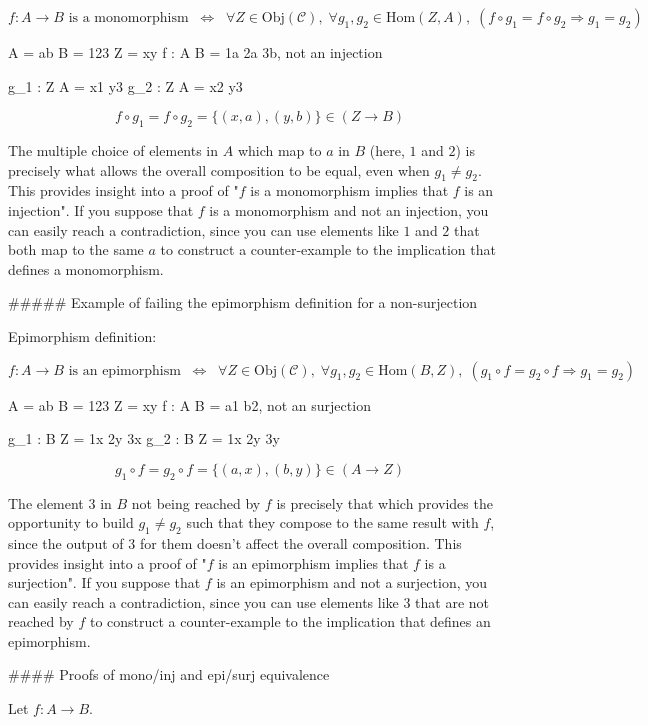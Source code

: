 $$
\text{$f : A \to B$ is a monomorphism}
\; \; \Leftrightarrow \; \; 
\forall Z \in \text{Obj}(\mathcal{C}), \;
\forall g_1, g_2 \in \text{Hom}(Z, A), \;
(f \circ g_1 = f \circ g_2 \Rightarrow g_1 = g_2)
$$

A = ab
B = 123
Z = xy
f : A \to B = 1a 2a 3b, not an injection

g_1 : Z \to A = x1 y3
g_2 : Z \to A = x2 y3

$$f \circ g_1 = f \circ g_2 = \{(x, a), (y, b)\} \in (Z \to B)$$

The multiple choice of elements in $A$ which map to $a$ in $B$ (here, $1$ and $2$) is precisely what allows the overall composition to be equal, even when $g_1 \neq g_2$. This provides insight into a proof of "$f$ is a monomorphism implies that $f$ is an injection". If you suppose that $f$ is a monomorphism and not an injection, you can easily reach a contradiction, since you can use elements like $1$ and $2$ that both map to the same $a$ to construct a counter-example to the implication that defines a monomorphism.


##### Example of failing the epimorphism definition for a non-surjection 

Epimorphism definition:

$$
\text{$f : A \to B$ is an epimorphism}
\; \; \Leftrightarrow \; \; 
\forall Z \in \text{Obj}(\mathcal{C}), \;
\forall g_1, g_2 \in \text{Hom}(B, Z), \;
(g_1 \circ f = g_2 \circ f \Rightarrow g_1 = g_2)
$$

A = ab
B = 123
Z = xy
f : A \to B = a1 b2, not an surjection

g_1 : B \to Z = 1x 2y 3x
g_2 : B \to Z = 1x 2y 3y

$$g_1 \circ f = g_2 \circ f = \{(a, x), (b, y)\} \in (A \to Z)$$

The element $3$ in $B$ not being reached by $f$ is precisely that which provides the opportunity to build $g_1 \neq g_2$ such that they compose to the same result with $f$, since the output of $3$ for them doesn't affect the overall composition. This provides insight into a proof of "$f$ is an epimorphism implies that $f$ is a surjection". If you suppose that $f$ is an epimorphism and not a surjection, you can easily reach a contradiction, since you can use elements like $3$ that are not reached by $f$ to construct a counter-example to the implication that defines an epimorphism.



#### Proofs of mono/inj and epi/surj equivalence

Let $f : A \to B$.

